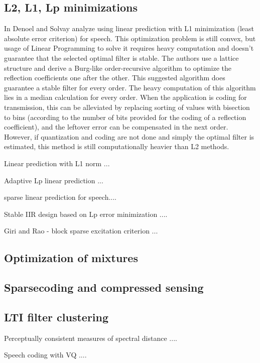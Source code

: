 \documentclass[journal]{IEEEtran}
\begin{document}
\subsection{L2, L1, Lp minimizations}
In \cite{denoel1985leastAbsolute} Denoel and Solvay analyze using linear prediction with L1 minimization (least absolute error criterion) for speech. This optimization problem is still convex, but usage of Linear Programming to solve it requires heavy computation and doesn't guarantee that the selected optimal filter is stable. The authors use a lattice structure and derive a Burg-like order-recursive algorithm to optimize the reflection coefficients one after the other. This suggested algorithm does guarantee a stable filter for every order. The heavy computation of this algorithm lies in a median calculation for every order. When the application is coding for transmission, this can be alleviated by replacing sorting of values with bisection to bins (according to the number of bits provided for the coding of a reflection coefficient), and the leftover error can be compensated in the next order. However, if quantization and coding are not done and simply the optimal filter is estimated, this method is still computationally heavier than L2 methods.

Linear prediction with L1 norm \cite{schroeder1989linear}...

Adaptive Lp linear prediction \cite{lansford1988adaptive}...

\cite{giacobello2008sparse,giacobello2012sparse} sparse linear prediction for speech....

Stable IIR design based on Lp error minimization \cite{tseng2004design}....

Giri and Rao - block sparse excitation criterion \cite{giri2014block}...
\subsection{Optimization of mixtures}
\subsection{Sparsecoding and compressed sensing}
\subsection{LTI filter clustering}
Perceptually consistent measures of spectral distance \cite{viswanathan1976spectralDistance}....

Speech coding with VQ \cite{makhoul1985VQ}....
\end{document}
